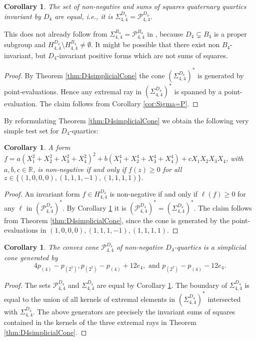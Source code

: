 \documentclass[11pt,a4paper]{amsart}
\numberwithin{equation}{section}
\newtheorem{cor}[thm]{Corollary}
\theoremstyle{definition}
\newcommand{\R}{\mathbb{R}}
\numberwithin{thm}{section}
\theoremstyle{break}
\numberwithin{subcase}{case}
\begin{document}
\begin{cor}\label{d4}
The set of non-negative and sums of squares quaternary quartics invariant by $D_4$ are equal, i.e., it is
$\Sigma_{4,4}^{D_4} = \mathcal{P}_{4,4}^{D_4}$.
\end{cor}
This does not already follow from $\Sigma_{4,4}^{B_4} = \mathcal{P}_{4,4}^{B_4}$ in \cite{goel2017analogue}, because $D_4 \subsetneq B_4$ is a proper subgroup and  $H_{4,4}^{D_4}\setminus H_{4,4}^{B_4}\neq \emptyset$. It might be possible that there exist non $B_4$-invariant, but $D_4$-invariant positive forms which are not sums of squares.
\begin{proof}
By Theorem \ref{thm:D4simplicialCone} the cone $\left( \Sigma_{4,4}^{D_4} \right)^\ast$ is generated by point-evaluations. Hence any extremal ray in $\left( \Sigma_{4,4}^{D_4} \right)^\ast$ is spanned by a point-evaluation. The claim follows from Corollary \ref{cor:Sigma=P}.
\end{proof}

By reformulating Theorem \ref{thm:D4simplicialCone} we obtain the following very simple test set for $D_4$-quartics:
\begin{cor}
A form $f = a(X_1^2+X_2^2+X_3^2+X_4^2)^2+b(X_1^4+X_2^4+X_3^4+X_4^4)+cX_1X_2X_3X_4$, with $a,b,c \in \R$, is non-negative if and only if $f(z) \geq 0$ for all $z \in \{ (1,0,0,0),(1,1,1,-1),(1,1,1,1)\}.$
\end{cor}
\begin{proof}
An invariant form $f \in H_{4,4}^{D_4}$ is non-negative if and only if $\ell (f) \geq 0$ for any $\ell$ in $\left( \mathcal{P}_{4,4}^{D_4}\right)^\ast.$ By Corollary \ref{d4} it is $\left( \mathcal{P}_{4,4}^{D_4}\right)^\ast = \left(\Sigma_{4,4}^{D_4}\right)^\ast$. The claim follows from Theorem \ref{thm:D4simplicialCone}, since the cone is generated by the point-evaluations in $(1,0,0,0),(1,1,1,-1),(1,1,1,1)$.
\end{proof} 

\begin{cor}
The convex cone $\mathcal{P}_{4,4}^{D_4}$ of non-negative $D_4$-quartics is a simplicial cone generated by $$4p_{(4)}-p_{(2^2)}, p_{(2^2)}-p_{(4)}+12e_4, \text{  and  } p_{(2^2)}-p_{(4)}-12e_4.$$ 
\end{cor}
\begin{proof}
The sets $\mathcal{P}_{4,4}^{D_4}$ and $\Sigma_{4,4}^{D_4}$ are equal by Corollary \ref{d4}. The boundary of $\Sigma_{4,4}^{D_4}$ is equal to the union of all kernels of extremal elements in $\left(\Sigma_{4,4}^{D_4}\right)^\ast$ intersected with $\Sigma_{4,4}^{D_4}$. The above generators are precisely the invariant sums of squares contained in the kernels of the three extremal rays in Theorem \ref{thm:D4simplicialCone}.
\end{proof}
\end{document}
